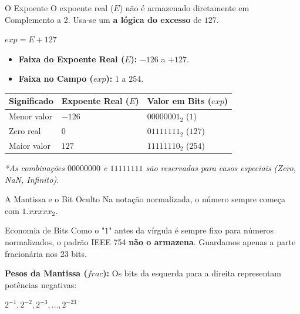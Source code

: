 \begin{frame}{O Expoente}
    O expoente real ($E$) não é armazenado diretamente em Complemento a 2. Usa-se um \textbf{a lógica do excesso} de $127$.

    \begin{center}
        \Large $exp = E + 127$
    \end{center}

    \begin{itemize}
        \item \textbf{Faixa do Expoente Real ($E$):} $-126$ a $+127$.
        \item \textbf{Faixa no Campo ($exp$):} $1$ a $254$.
    \end{itemize}

    \begin{table}[]
        \begin{tabular}{l|l|l}
            \textbf{Significado} & \textbf{Expoente Real ($E$)} & \textbf{Valor em Bits ($exp$)} \\ \hline
            Menor valor          & $-126$                       & $00000001_2$ ($1$)             \\
            Zero real            & $0$                          & $01111111_2$ ($127$)           \\
            Maior valor          & $127$                        & $11111110_2$ ($254$)           \\
        \end{tabular}
    \end{table}
    \textit{*As combinações $00000000$ e $11111111$ são reservadas para casos especiais (Zero, NaN, Infinito).}
\end{frame}

\begin{frame}{A Mantissa e o Bit Oculto}
    Na notação normalizada, o número sempre começa com $1.xxxxx_2$.

    \begin{block}{Economia de Bits}
        Como o "$1$" antes da vírgula é sempre fixo para números normalizados, o padrão IEEE 754 \textbf{não o armazena}.
        Guardamos apenas a parte fracionária nos 23 bits.
    \end{block}



    \textbf{Pesos da Mantissa ($frac$):}
    Os bits da esquerda para a direita representam potências negativas:
    \begin{center}
        $2^{-1}, 2^{-2}, 2^{-3}, \dots, 2^{-23}$
    \end{center}
\end{frame}

